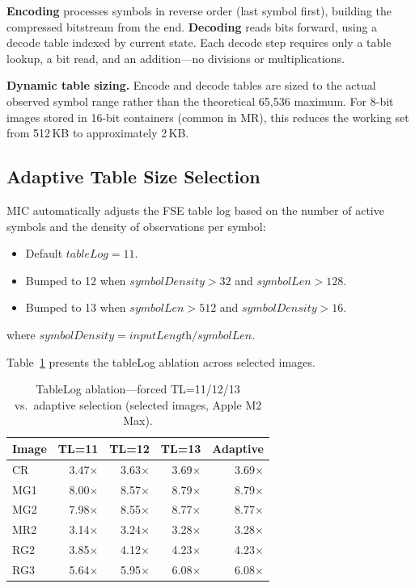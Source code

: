 \documentclass[journal]{IEEEtran}
\begin{document}
\textbf{Encoding} processes symbols in reverse order (last symbol first),
building the compressed bitstream from the end. \textbf{Decoding} reads bits
forward, using a decode table indexed by current state. Each decode step
requires only a table lookup, a bit read, and an addition---no divisions or
multiplications.

\textbf{Dynamic table sizing.} Encode and decode tables are sized to the actual
observed symbol range rather than the theoretical 65,536 maximum. For 8-bit
images stored in 16-bit containers (common in MR), this reduces the working set
from 512\,KB to approximately 2\,KB.

\subsection{Adaptive Table Size Selection}

MIC automatically adjusts the FSE table log based on the number of active
symbols and the density of observations per symbol:
\begin{itemize}
  \item Default $\textit{tableLog} = 11$.
  \item Bumped to 12 when $\textit{symbolDensity} > 32$ and
  $\textit{symbolLen} > 128$.
  \item Bumped to 13 when $\textit{symbolLen} > 512$ and
  $\textit{symbolDensity} > 16$.
\end{itemize}
where $\textit{symbolDensity} = \textit{inputLength} / \textit{symbolLen}$.

Table~\ref{tab:tablelog-ablation} presents the tableLog ablation across
selected images.

\begin{table}[htbp]
\centering
\caption{TableLog ablation---forced TL=11/12/13 vs.\ adaptive selection
(selected images, Apple M2 Max).}
\label{tab:tablelog-ablation}
\scriptsize
\begin{tabular}{lrrrr}
\toprule
Image & TL=11 & TL=12 & TL=13 & Adaptive \\
\midrule
CR  & 3.47$\times$ & 3.63$\times$ & 3.69$\times$ & 3.69$\times$ \\
MG1 & 8.00$\times$ & 8.57$\times$ & 8.79$\times$ & 8.79$\times$ \\
MG2 & 7.98$\times$ & 8.55$\times$ & 8.77$\times$ & 8.77$\times$ \\
MR2 & 3.14$\times$ & 3.24$\times$ & 3.28$\times$ & 3.28$\times$ \\
RG2 & 3.85$\times$ & 4.12$\times$ & 4.23$\times$ & 4.23$\times$ \\
RG3 & 5.64$\times$ & 5.95$\times$ & 6.08$\times$ & 6.08$\times$ \\
\bottomrule
\end{tabular}
\end{table}
\end{document}
